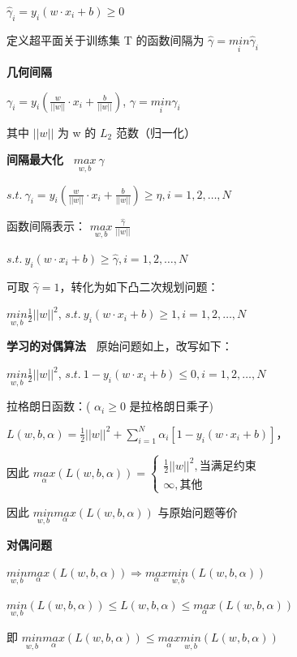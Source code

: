 \documentclass[b4paper, 10pt]{ctexart}
\begin{document}
\begin{multicols}{3}
$\hat{\gamma}_i = y_i(w\cdot x_i+b)\ge 0$

定义超平面关于训练集 T 的函数间隔为 $\hat{\gamma} = \underset{i}{min} \hat{\gamma}_i$ 


\textbf{几何间隔\ }

$\gamma_i = y_i(\frac{w}{||w||}\cdot x_i+\frac{b}{||w||})$, 
$\gamma = \underset{i}{min} \gamma_i$ 

其中 $||w||$ 为 w 的 $L_2$ 范数（归一化）

\textbf{间隔最大化\ }
$
\underset{w,b}{max}\  \gamma
$

$
s.t.\ \gamma_i = y_i(\frac{w}{||w||}\cdot x_i+\frac{b}{||w||}) \ge \eta, i=1,2,\dots,N
$

函数间隔表示：
$
\underset{w,b}{max}\ \frac{\hat{\gamma}}{||w||}
$

$
s.t.\ y_i(w\cdot x_i+b)\ge \hat{\gamma},i=1,2,\dots,N
$

可取 $\hat{\gamma} = 1$，转化为如下凸二次规划问题：

$
\underset{w,b}{min} \frac{1}{2}||w||^2
$, 
$
s.t.\ y_i(w\cdot x_i+b)\ge 1, i=1,2,\dots,N
$

\textbf{学习的对偶算法\ } 原始问题如上，改写如下：

$
\underset{w,b}{min} \frac{1}{2}||w||^2
$,
$
s.t.\ 1 - y_i(w\cdot x_i+b)\le 0, i=1,2,\dots,N
$

拉格朗日函数：( $\alpha_i \ge 0$ 是拉格朗日乘子)

$L(w,b,\alpha) = \frac 1 2 ||w||^2 + \sum_{i=1}^N \alpha_i[1-y_i(w\cdot x_i + b)]$，

因此 $\underset{\alpha}{max}(L(w,b,\alpha)) = \begin{cases}
    \frac{1}{2} ||w||^2, \mbox{当满足约束}\\
    \infty, \mbox{其他}
\end{cases}$

因此 $\underset{w,b}{min} \underset{\alpha}{max} (L(w,b,\alpha))$
 与原始问题等价

\textbf{对偶问题\ } 

$\underset{w,b}{min} \underset{\alpha}{max}(L(w,b,\alpha)) \Rightarrow \underset{\alpha}{max}\underset{w,b}{min}(L(w,b,\alpha))$

$\underset{w,b}{min}(L(w,b,\alpha))\le L(w,b,\alpha)\le \underset{\alpha}{max}(L(w,b,\alpha))$

即 $\underset{w,b}{min} \underset{\alpha}{max}(L(w,b,\alpha)) \le \underset{\alpha}{max}\underset{w,b}{min}(L(w,b,\alpha))$


\end{multicols}
\end{document}
